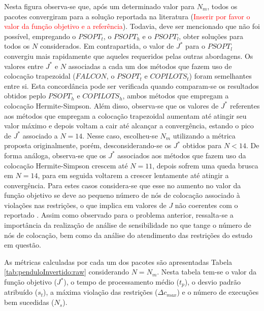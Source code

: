 Nesta figura observa-se que, após um determinado valor para $N_m$, todos os pacotes convergiram para a solução reportada na literatura (\textcolor{red}{Inserir por favor o valor da função objetivo e a referência}). Todavia, deve ser mencionado que não foi possível, empregando o $ PSOPT_t $, o $ PSOPT_h $ e o $ PSOPT_l $, obter soluções para todos os $ N $ considerados. Em contrapartida, o valor de $ J^* $ para o $ PSOPT_l $ convergiu mais rapidamente que aqueles requeridos pelas outras abordagens. Os valores entre $ J^* $ e $ N $ associadas a cada um dos métodos que fazem uso de colocação trapezoidal ($ FALCON $, o $ PSOPT_t $ e $ COPILOTS_t $) foram semelhantes entre si. Esta concordância pode ser verificada quando comparam-se os resultados obtidos peplo $ PSOPT_h $ e $ COPILOTS_h $, ambos métodos que empregam a colocação Hermite-Simpson. Além disso, observa-se que os valores de  $ J^* $ referentes aos métodos que empregam a colocação trapezoidal aumentam até atingir seu valor máximo e depois voltam a cair até alcançar a convergência, estando o pico de $ J^* $ associado a $ N = 14 $. Nesse caso, escolheu-se $ N_m $ utilizando a métrica proposta originalmente, porém, desconsiderando-se os $ J^* $ obtidos para $ N < 14 $. De forma análoga, observa-se que os $ J^* $ associados aos métodos que fazem uso da colocação Hermite-Simpson crescem até $ N = 11 $, depois sofrem uma queda brusca em $ N = 14 $, para em seguida voltarem a crescer lentamente até atingir a convergência. Para estes casos considera-se que esse no aumento no valor da função objetivo se deve ao pequeno número de nós de colocação associado à violações nas restrições, o que implica em valores de $J$ não coerentes com o reportado \cite{kelly_introduction_2017}. Assim como observado para o problema anterior, ressalta-se a importância da realização de análise de sensibilidade no que tange o número de nós de colocação, bem como da análise do atendimento das restrições do estudo em questão.


As métricas calculadas por cada um dos pacotes são apresentadas Tabela \ref{tab:penduloInvertido:raw} considerando $N=N_m$. Nesta tabela tem-se o valor da função objetivo ($ J^* $), o tempo de processamento médio ($ t_p $), o desvio padrão atribuído ($ s_t $), a máxima violação das restrições ($ \Delta c_{max} $) e o número de execuções bem sucedidas ($ N_s $).



